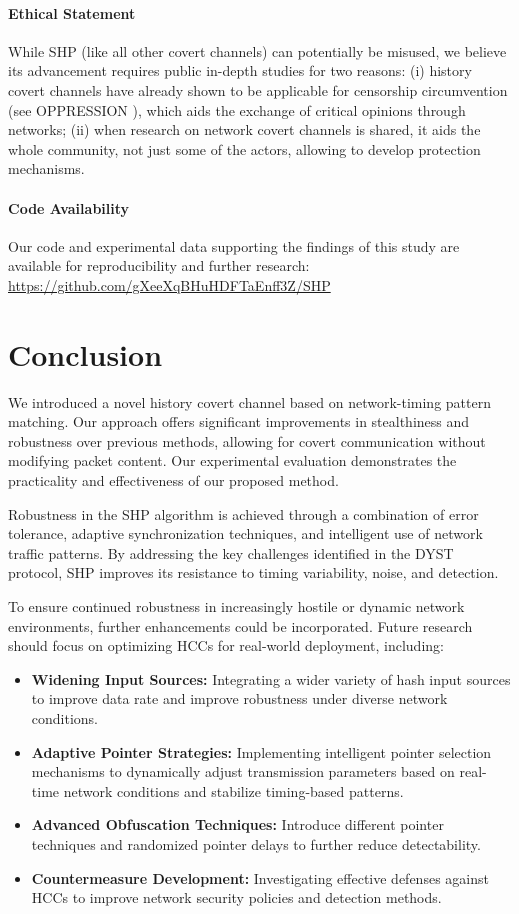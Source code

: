 \documentclass[journal]{IEEEtran}
\begin{document}
\paragraph*{Ethical Statement}
While \ac{SHP} (like all other covert channels) can potentially be misused, we believe its advancement requires public in-depth studies for two reasons: (i) history covert channels have already shown to be applicable for censorship circumvention (see \textsc{OPPRESSION} \cite{AsiaCCS24:OPPR}), which aids the exchange of critical opinions through networks; (ii) when research on network covert channels is shared, it aids the whole community, not just some of the actors, allowing to develop protection mechanisms.


\paragraph*{Code Availability}
Our code and experimental data supporting the findings of this study are available for reproducibility and further research: \url{https://github.com/gXeeXqBHuHDFTaEnff3Z/SHP}

\section{Conclusion}
We introduced a novel history covert channel based on network-timing pattern matching. Our approach offers significant improvements in stealthiness and robustness over previous methods, allowing for covert communication without modifying packet content. Our experimental evaluation demonstrates the practicality and effectiveness of our proposed method.

Robustness in the SHP algorithm is achieved through a combination of error tolerance, adaptive synchronization techniques, and intelligent use of network traffic patterns. By addressing the key challenges identified in the \ac{DYST} protocol, SHP improves its resistance to timing variability, noise, and detection.

To ensure continued robustness in increasingly hostile or dynamic network environments, further enhancements could be incorporated. Future research should focus on optimizing \ac{HCC}s for real-world deployment, including:
\begin{itemize}
    \item \textbf{Widening Input Sources:} Integrating a wider variety of hash input sources to improve data rate and improve robustness under diverse network conditions. 
    \item \textbf{Adaptive Pointer Strategies:} Implementing intelligent pointer selection mechanisms to dynamically adjust transmission parameters based on real-time network conditions and stabilize timing-based patterns.
    \item \textbf{Advanced Obfuscation Techniques:} Introduce different pointer techniques and randomized pointer delays to further reduce detectability.
    \item \textbf{Countermeasure Development:} Investigating effective defenses against \ac{HCC}s to improve network security policies and detection methods.
\end{itemize}
\end{document}

